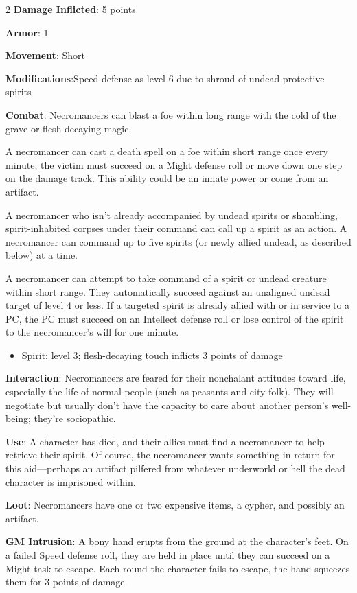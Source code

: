 \begin{multicols}{2}
\textbf{Damage Inflicted}: 5 points 

\textbf{Armor}: 1 

\textbf{Movement}: Short 

\textbf{Modifications}:Speed defense as level 6 due to shroud of undead protective spirits 

\textbf{Combat}: Necromancers can blast a foe within long range with the cold of the grave or flesh-decaying magic. 

A necromancer can cast a death spell on a foe within short range once every minute; the victim must succeed on a Might defense roll or move down one step on the damage track. This ability could be an innate power or come from an artifact. 

A necromancer who isn’t already accompanied by undead spirits or shambling, spirit-inhabited corpses under their command can call up a spirit as an action. A necromancer can command up to five spirits (or newly allied undead, as described below) at a time. 

A necromancer can attempt to take command of a spirit or undead creature within short range. They automatically succeed against an unaligned undead target of level 4 or less. If a targeted spirit is already allied with or in service to a PC, the PC must succeed on an Intellect defense roll or lose control of the spirit to the necromancer’s will for one minute. 

\begin{itemize} 
\item Spirit: level 3; flesh-decaying touch inflicts 3 points of damage
\end{itemize}

\textbf{Interaction}: Necromancers are feared for their nonchalant attitudes toward life, especially the life of normal people (such as peasants and city folk). They will negotiate but usually don’t have the capacity to care about another person’s well-being; they’re sociopathic. 

\textbf{Use}: A character has died, and their allies must find a necromancer to help retrieve their spirit. Of course, the necromancer wants something in return for this aid—perhaps an artifact pilfered from whatever underworld or hell the dead character is imprisoned within. 

\textbf{Loot}: Necromancers have one or two expensive items, a cypher, and possibly an artifact.

\textbf{GM Intrusion}: A bony hand erupts from the ground at the character’s feet. On a failed Speed defense roll, they are held in place until they can succeed on a Might task to escape. Each round the character fails to escape, the hand squeezes them for 3 points of damage.


\end{multicols}
